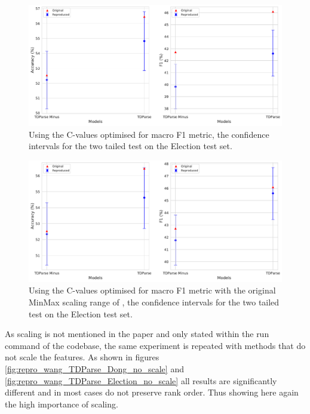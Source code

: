 \begin{figure}[!h]
    \centering
    \includegraphics[scale=0.37]{images/reproducibility/wang/TDParse_F1_C_value_Election.pdf}
    \caption{Using the C-values optimised for macro F1 metric, the confidence intervals for the two tailed test on the \citet{wang-etal-2017-tdparse} Election test set.}
    \label{fig:repro_wang_TDParse_Election_macro_f1_c_values}
\end{figure}

\begin{figure}[!h]
    \centering
    \includegraphics[scale=0.37]{images/reproducibility/wang/TDParse_F1_C_value_alt_scale_Election.pdf}
    \caption{Using the C-values optimised for macro F1 metric with the original MinMax scaling range of \citet{wang-etal-2017-tdparse}, the confidence intervals for the two tailed test on the \citet{wang-etal-2017-tdparse} Election test set.}
    \label{fig:repro_wang_TDParse_Election_alt_scaling_macro_f1_c_values}
\end{figure}

As scaling is not mentioned in the paper and only stated within the run command of the codebase, the same experiment is repeated with methods that do not scale the features. As shown in figures \ref{fig:repro_wang_TDParse_Dong_no_scale} and \ref{fig:repro_wang_TDParse_Election_no_scale} all results are significantly different and in most cases do not preserve rank order. Thus showing here again the high importance of scaling.


